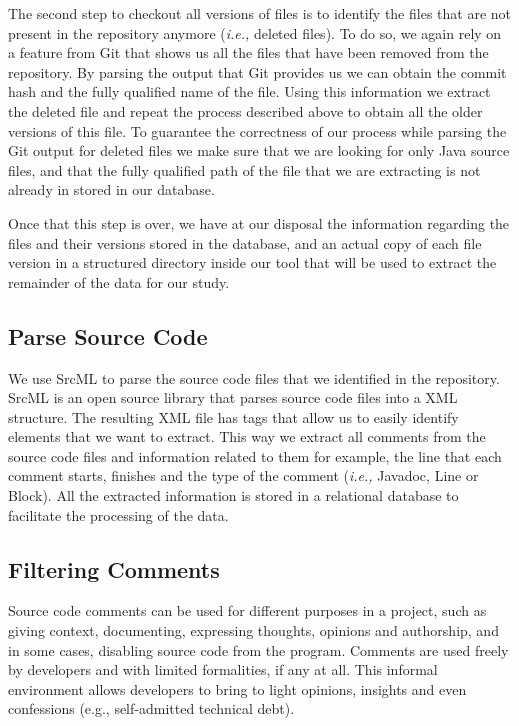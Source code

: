 The second step to checkout all versions of files is to identify the files that are not present in the repository anymore (\textit{i.e.,} deleted files). To do so, we again rely on a feature from Git that shows us all the files that have been removed from the repository. By parsing the output that Git provides us we can obtain the commit hash and the fully qualified name of the file. Using this information we extract the deleted file and repeat the process described above to obtain all the older versions of this file. To guarantee the correctness of our process while parsing the Git output for deleted files we make sure that we are looking for only Java source files, and that the fully qualified path of the file that we are extracting is not already in stored in our database. 

Once that this step is over, we have at our disposal the information regarding the files and their versions stored in the database, and an actual copy of each file version in a structured directory inside our tool that will be used to extract the remainder of the data for our study.

\subsection{Parse Source Code}
\label{sub:parse_source_code}

We use SrcML \cite{Collard2013SIE} to parse the source code files that we identified in the repository. SrcML is an open source library that parses source code files into a XML structure. The resulting XML file has tags that allow us to easily identify elements that we want to extract. This way we extract all comments from the source code files and information related to them for example, the line that each comment starts, finishes and the type of the comment (\textit{i.e.,} Javadoc, Line or Block). All the extracted information is stored in a relational database to facilitate the processing of the data. 


\subsection{Filtering Comments}
\label{sub:filtering_comments}

Source code comments can be used for different purposes in a project, such as giving context, documenting, expressing thoughts, opinions and authorship, and in some cases, disabling source code from the program.  Comments are used freely by developers and with limited formalities, if any at all. This informal environment allows developers to bring to light opinions, insights and even confessions (e.g., self-admitted technical debt). 

